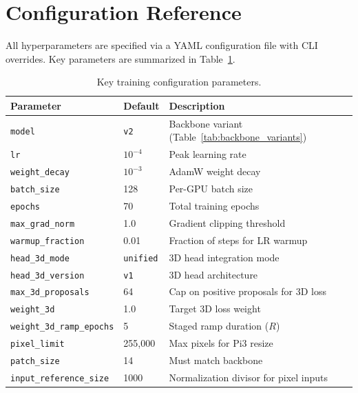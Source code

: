 \documentclass[runningheads]{llncs}
\begin{document}
\section{Configuration Reference}
\label{sec:config}

All hyperparameters are specified via a YAML configuration file with CLI overrides.  Key parameters are summarized in Table~\ref{tab:config}.

\begin{table}[h]
\centering
\caption{Key training configuration parameters.}
\label{tab:config}
\small
\begin{tabular}{@{}llp{6cm}@{}}
\toprule
\textbf{Parameter} & \textbf{Default} & \textbf{Description} \\
\midrule
\texttt{model} & \texttt{v2} & Backbone variant (Table~\ref{tab:backbone_variants}) \\
\texttt{lr} & $10^{-4}$ & Peak learning rate \\
\texttt{weight\_decay} & $10^{-3}$ & AdamW weight decay \\
\texttt{batch\_size} & 128 & Per-GPU batch size \\
\texttt{epochs} & 70 & Total training epochs \\
\texttt{max\_grad\_norm} & 1.0 & Gradient clipping threshold \\
\texttt{warmup\_fraction} & 0.01 & Fraction of steps for LR warmup \\
\texttt{head\_3d\_mode} & \texttt{unified} & 3D head integration mode \\
\texttt{head\_3d\_version} & \texttt{v1} & 3D head architecture \\
\texttt{max\_3d\_proposals} & 64 & Cap on positive proposals for 3D loss \\
\texttt{weight\_3d} & 1.0 & Target 3D loss weight \\
\texttt{weight\_3d\_ramp\_epochs} & 5 & Staged ramp duration ($R$) \\
\texttt{pixel\_limit} & 255,000 & Max pixels for Pi3 resize \\
\texttt{patch\_size} & 14 & Must match backbone \\
\texttt{input\_reference\_size} & 1000 & Normalization divisor for pixel inputs \\
\bottomrule
\end{tabular}
\end{table}
\end{document}
